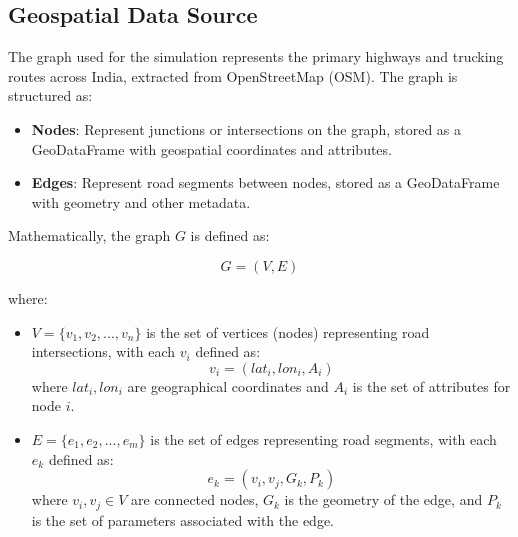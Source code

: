 \documentclass[sigplan,screen]{acmart}
\begin{document}
\subsection{Geospatial Data Source}
The graph used for the simulation represents the primary highways and trucking routes across India, extracted from OpenStreetMap (OSM). The graph is structured as:

\begin{itemize}
    \item \textbf{Nodes}: Represent junctions or intersections on the graph, stored as a GeoDataFrame with geospatial coordinates and attributes.
    \item \textbf{Edges}: Represent road segments between nodes, stored as a GeoDataFrame with geometry and other metadata.
\end{itemize}

Mathematically, the graph $G$ is defined as:

\[G = (V, E)\]

where:
\begin{itemize}
    \item $V = \{v_1, v_2, ..., v_n\}$ is the set of vertices (nodes) representing road intersections, with each $v_i$ defined as:
    \[v_i = (lat_i, lon_i, A_i)\]
    where $lat_i, lon_i$ are geographical coordinates and $A_i$ is the set of attributes for node $i$.

    \item $E = \{e_1, e_2, ..., e_m\}$ is the set of edges representing road segments, with each $e_k$ defined as:
    \[e_k = (v_i, v_j, G_k, P_k)\]
    where $v_i, v_j \in V$ are connected nodes, $G_k$ is the geometry of the edge, and $P_k$ is the set of parameters associated with the edge.
\end{itemize}
\end{document}
